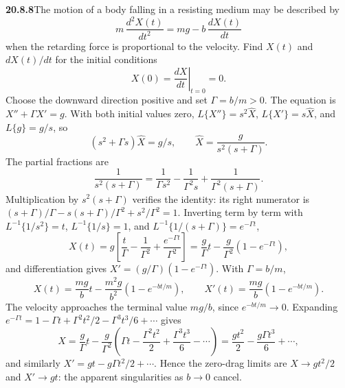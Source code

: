 \par\bigskip
\noindent\textbf{20.8.8}\quad The motion of a body falling in a
resisting medium may be described by
\[
m\,\frac{d^{2}X(t)}{dt^{2}}=mg-b\,\frac{dX(t)}{dt}
\]
when the retarding force is proportional to the velocity. Find
$X(t)$ and $dX(t)/dt$ for the initial conditions
\[
X(0)=\left.\frac{dX}{dt}\right|_{t=0}=0.
\]
\solution
Choose the downward direction positive and set
$\Gamma=b/m>0$. The equation is $X''+\Gamma X'=g$.
With both initial values zero, $L\{X''\}=s^2\widehat X$,
$L\{X'\}=s\widehat X$, and $L\{g\}=g/s$, so
\[
(s^2+\Gamma s)\widehat X=g/s,\qquad
\widehat X=\frac g{s^2(s+\Gamma)}.
\]
The partial fractions are
\[
\frac1{s^2(s+\Gamma)}
=\frac1{\Gamma s^2}-\frac1{\Gamma^2s}
+\frac1{\Gamma^2(s+\Gamma)}.
\]
Multiplication by $s^2(s+\Gamma)$ verifies the identity: its
right numerator is $(s+\Gamma)/\Gamma-s(s+\Gamma)/\Gamma^2
+s^2/\Gamma^2=1$. Inverting term by term with
$L^{-1}\{1/s^2\}=t$, $L^{-1}\{1/s\}=1$, and
$L^{-1}\{1/(s+\Gamma)\}=e^{-\Gamma t}$,
\[
X(t)=g\left[\frac t\Gamma-\frac1{\Gamma^2}
+\frac{e^{-\Gamma t}}{\Gamma^2}\right]
=\frac g\Gamma t-\frac g{\Gamma^2}(1-e^{-\Gamma t}),
\]
and differentiation gives $X'=(g/\Gamma)(1-e^{-\Gamma t})$.
With $\Gamma=b/m$,
\[
\boxed{X(t)=\frac{mg}{b}t-\frac{m^2g}{b^2}(1-e^{-bt/m})},
\qquad
\boxed{X'(t)=\frac{mg}{b}(1-e^{-bt/m})}.
\]
The velocity approaches the terminal value $mg/b$, since
$e^{-bt/m}\to0$. Expanding
$e^{-\Gamma t}=1-\Gamma t+\Gamma^2t^2/2-\Gamma^3t^3/6+\cdots$
gives
\[
X=\frac g\Gamma t-\frac g{\Gamma^2}
\left(\Gamma t-\frac{\Gamma^2t^2}2+\frac{\Gamma^3t^3}6
-\cdots\right)
=\frac{gt^2}2-\frac{g\Gamma t^3}6+\cdots,
\]
and similarly $X'=gt-g\Gamma t^2/2+\cdots$. Hence the
zero-drag limits are $X\to gt^2/2$ and $X'\to gt$: the
apparent singularities as $b\to0$ cancel.

